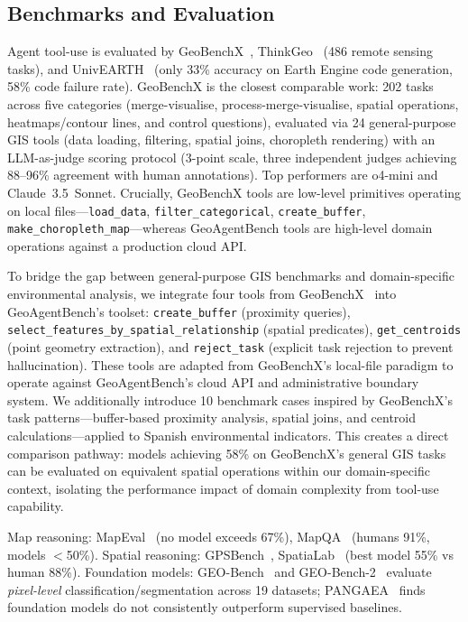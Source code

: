 \documentclass[10pt,twocolumn]{article}
\begin{document}
\subsection{Benchmarks and Evaluation}

Agent tool-use is evaluated by GeoBenchX~\cite{krechetova2025geobenchx}, ThinkGeo~\cite{shabbir2025thinkgeo} (486 remote sensing tasks), and UnivEARTH~\cite{kao2025univearth} (only 33\% accuracy on Earth Engine code generation, 58\% code failure rate). GeoBenchX is the closest comparable work: 202 tasks across five categories (merge-visualise, process-merge-visualise, spatial operations, heatmaps/contour lines, and control questions), evaluated via 24 general-purpose GIS tools (data loading, filtering, spatial joins, choropleth rendering) with an LLM-as-judge scoring protocol (3-point scale, three independent judges achieving 88--96\% agreement with human annotations). Top performers are o4-mini and Claude~3.5~Sonnet. Crucially, GeoBenchX tools are low-level primitives operating on local files---\texttt{load\_data}, \texttt{filter\_categorical}, \texttt{create\_buffer}, \texttt{make\_choropleth\_map}---whereas GeoAgentBench tools are high-level domain operations against a production cloud API.

To bridge the gap between general-purpose GIS benchmarks and domain-specific environmental analysis, we integrate four tools from GeoBenchX~\cite{krechetova2025geobenchx} into GeoAgentBench's toolset: \texttt{create\_buffer} (proximity queries), \texttt{select\_features\_by\_spatial\_relationship} (spatial predicates), \texttt{get\_centroids} (point geometry extraction), and \texttt{reject\_task} (explicit task rejection to prevent hallucination). These tools are adapted from GeoBenchX's local-file paradigm to operate against GeoAgentBench's cloud API and administrative boundary system. We additionally introduce 10 benchmark cases inspired by GeoBenchX's task patterns---buffer-based proximity analysis, spatial joins, and centroid calculations---applied to Spanish environmental indicators. This creates a direct comparison pathway: models achieving 58\% on GeoBenchX's general GIS tasks can be evaluated on equivalent spatial operations within our domain-specific context, isolating the performance impact of domain complexity from tool-use capability.

Map reasoning: MapEval~\cite{dihan2025mapeval} (no model exceeds 67\%), MapQA~\cite{arnold2025mapqa} (humans 91\%, models $<$50\%). Spatial reasoning: GPSBench~\cite{truong2026gpsbench}, SpatiaLab~\cite{wasi2026spatialab} (best model 55\% vs human 88\%). Foundation models: GEO-Bench~\cite{lacoste2023geobench} and GEO-Bench-2~\cite{simumba2025geobench2} evaluate \emph{pixel-level} classification/segmentation across 19 datasets; PANGAEA~\cite{marsocci2024pangaea} finds foundation models do not consistently outperform supervised baselines.
\end{document}
